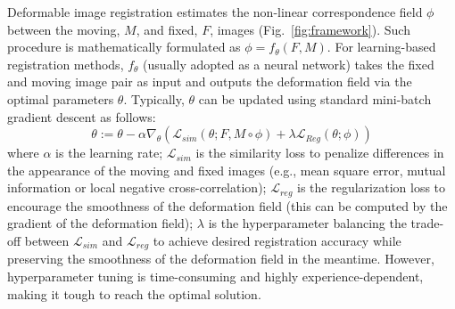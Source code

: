 \documentclass[runningheads]{llncs}
\begin{document}
Deformable image registration estimates the non-linear correspondence field $\phi$ between the moving, $M$, and fixed, $F$, images (Fig.~\ref{fig:framework}). Such procedure is mathematically formulated as $\phi = f_\theta(F, M)$. For learning-based registration methods, $f_\theta$ (usually adopted as a neural network) takes the fixed and moving image pair as input and outputs the deformation field via the optimal parameters $\theta$. Typically, $\theta$ can be updated using standard mini-batch gradient descent as follows:
\begin{equation}
    \label{eq:GD}
    \theta := \theta - \alpha \nabla_\theta \left(\mathcal{L}_{sim}(\theta; F, M \circ \phi) + \lambda \mathcal{L}_{Reg}(\theta; \phi) \right)
\end{equation}
where $\alpha$ is the learning rate; $\mathcal{L}_{sim}$ is the similarity loss to penalize differences in the appearance of the moving and fixed images (e.g., mean square error, mutual information or local negative cross-correlation); $\mathcal{L}_{reg}$ is the regularization loss to encourage the smoothness of the deformation field (this can be computed by the gradient of the deformation field); $\lambda$ is the hyperparameter balancing the trade-off between $\mathcal{L}_{sim}$ and $\mathcal{L}_{reg}$ to achieve desired registration accuracy while preserving the smoothness of the deformation field in the meantime. 
However, hyperparameter tuning is time-consuming and highly experience-dependent, making it tough to reach the optimal solution. 
\end{document}
